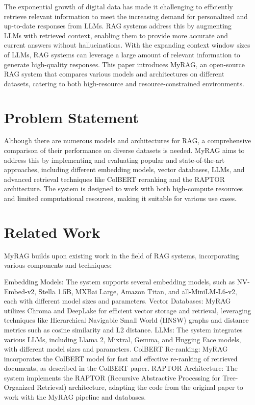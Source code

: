\documentclass{scrartcl}
\begin{document}
The exponential growth of digital data has made it challenging to efficiently retrieve relevant information to meet the increasing demand for personalized and up-to-date responses from LLMs. RAG systems address this by augmenting LLMs with retrieved context, enabling them to provide more accurate and current answers without hallucinations. With the expanding context window sizes of LLMs, RAG systems can leverage a large amount of relevant information to generate high-quality responses. This paper introduces MyRAG, an open-source RAG system that compares various models and architectures on different datasets, catering to both high-resource and resource-constrained environments.

\section{Problem Statement}

Although there are numerous models and architectures for RAG, a comprehensive comparison of their performance on diverse datasets is needed. MyRAG aims to address this by implementing and evaluating popular and state-of-the-art approaches, including different embedding models, vector databases, LLMs, and advanced retrieval techniques like ColBERT reranking and the RAPTOR architecture. The system is designed to work with both high-compute resources and limited computational resources, making it suitable for various use cases. 



\section{Related Work}

MyRAG builds upon existing work in the field of RAG systems, incorporating various components and techniques:

Embedding Models: The system supports several embedding models, such as NV-Embed-v2, Stella 1.5B, MXBai Large, Amazon Titan, and all-MiniLM-L6-v2, each with different model sizes and parameters.
Vector Databases: MyRAG utilizes Chroma and DeepLake for efficient vector storage and retrieval, leveraging techniques like Hierarchical Navigable Small World (HNSW) graphs and distance metrics such as cosine similarity and L2 distance.
LLMs: The system integrates various LLMs, including Llama 2, Mixtral, Gemma, and Hugging Face models, with different model sizes and parameters.
ColBERT Re-ranking: MyRAG incorporates the ColBERT model for fast and effective re-ranking of retrieved documents, as described in the ColBERT paper.
RAPTOR Architecture: The system implements the RAPTOR (Recursive Abstractive Processing for Tree-Organized Retrieval) architecture, adapting the code from the original paper to work with the MyRAG pipeline and databases.
\end{document}

